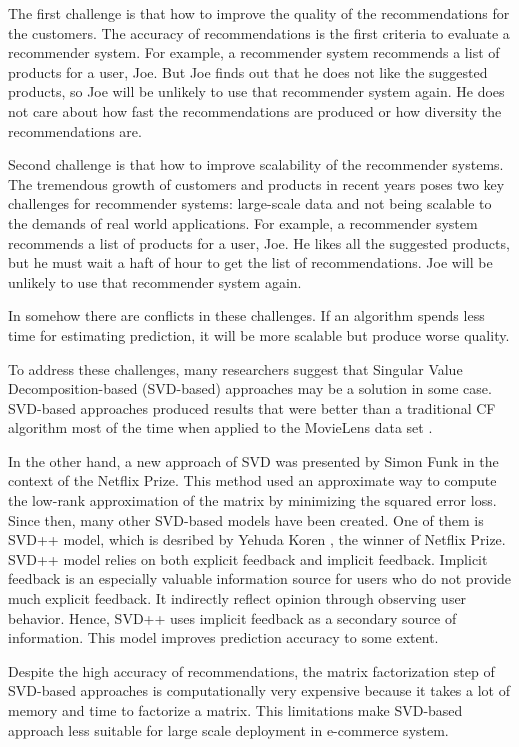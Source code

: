 \documentclass[oneside,13pt]{extreport}
\begin{document}
The first challenge is that how to improve the quality of the recommendations for the customers. The accuracy of recommendations is the first criteria to evaluate a recommender system. For example, a recommender system recommends a list of products for a user, Joe. But Joe finds out that he does not like the suggested products, so Joe will be unlikely to use that recommender system again. He does not care about how fast the recommendations are produced or how diversity the recommendations are.

Second challenge is that how to improve scalability of the recommender systems. The tremendous growth of customers and products in recent years poses two key challenges for recommender systems: large-scale data and not being scalable to the demands of real world applications. For example, a recommender system recommends a list of products for a user, Joe. He likes all the suggested products, but he must wait a haft of hour to get the list of recommendations. Joe will be unlikely to use that recommender system again. 

In somehow there are conflicts in these challenges. If an algorithm spends less time for estimating prediction, it will be more scalable but produce worse quality. 

To address these challenges, many researchers suggest that Singular Value Decomposition-based (SVD-based) approaches may be a solution in some case. SVD-based approaches produced results that were better than a traditional CF algorithm most of the time when applied to the MovieLens data set \cite{SarwarApplication}. 

In the other hand, a new approach of SVD was presented by Simon Funk in the context of the Netflix Prize\cite{SimonFunk}. This method used an approximate way to compute the low-rank approximation of the matrix by minimizing the squared error loss. Since then, many other SVD-based models have been created. One of them is SVD++ model, which is desribed by Yehuda Koren , the winner of Netflix Prize. SVD++ model relies on both explicit feedback and implicit feedback\cite{BellKorFactor}. Implicit feedback is an especially valuable information source for users who do not provide much explicit feedback. It indirectly reflect opinion through observing user behavior. Hence, SVD++ uses implicit feedback as a secondary source of information. This model improves prediction accuracy to some extent.

Despite the high accuracy of recommendations, the matrix factorization step of SVD-based approaches is computationally very expensive because it takes a lot of memory and time to factorize a matrix. This limitations make SVD-based approach less suitable for large scale deployment in e-commerce system. 
\end{document}

